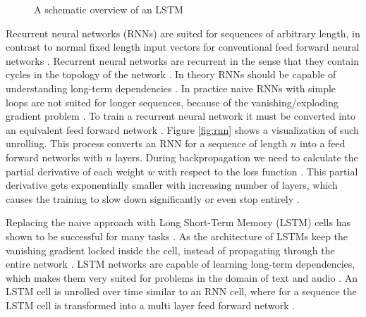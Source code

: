 \documentclass[draft,final,oneside]{vutinfth} %
\begin{document}
\begin{figure}[ht]

	
	
	\caption{A schematic overview of an LSTM \cite{hochreiter}}
	\label{fig:lstm}
\end{figure}

Recurrent neural networks (RNNs) are suited for sequences of arbitrary length, in contrast to normal fixed length input vectors for conventional feed forward neural networks \cite{hochreiter}. Recurrent neural networks are recurrent in the sense that they contain cycles in the topology of the network  \cite{deeplearninginneuralnetworks}. In theory RNNs should be capable of understanding long-term dependencies \cite{hochreiter}. In practice naive RNNs with simple loops are not suited for longer sequences, because of the vanishing/exploding gradient problem \cite{hochreiter}. To train a recurrent neural network it must be converted into an equivalent feed forward network \cite{Goodfellow-et-al-2016}. Figure \ref{fig:rnn} shows a visualization of such unrolling. This process converts an RNN for a sequence of length $n$ into a feed forward networks with $n$ layers. During backpropagation we need to calculate the partial derivative of each weight $w$ with respect to the loss function \cite{hochreiter}. This partial derivative gets exponentially smaller with increasing number of layers, which causes the training to slow down significantly or even stop entirely  \cite{hochreiter}.

Replacing the naive approach with Long Short-Term Memory (LSTM) cells has shown to be successful for many tasks \cite{nmt}\cite{hochreiter}\cite{deeplearninginneuralnetworks}. As the architecture of LSTMs keep the vanishing gradient locked inside the cell, instead of propagating through the entire network \cite{hochreiter}. LSTM networks are capable of learning long-term dependencies, which makes them very suited for problems in the domain of text and audio \cite{nmt}\cite{googlespeech}. An LSTM cell is unrolled over time similar to an RNN cell, where for a sequence the LSTM cell is transformed into a multi layer feed forward network \cite{colahlstm}. 
\end{document}

